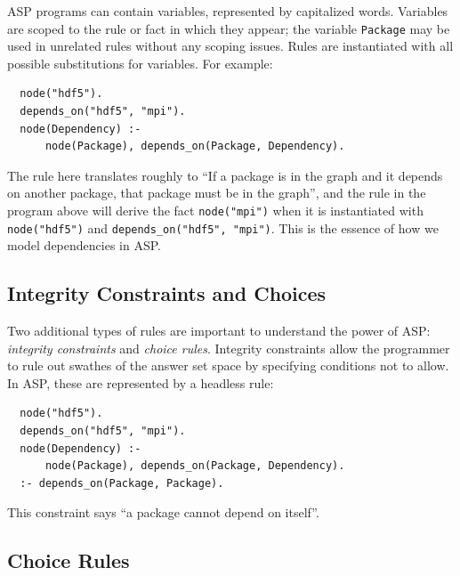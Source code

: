 ASP programs can contain variables, represented by capitalized words. Variables are
scoped to the rule or fact in which they appear; the variable {\tt Package} may be used
in unrelated rules without any scoping issues. Rules are instantiated with all possible
substitutions for variables. For example:
\begin{verbatim}
  node("hdf5").
  depends_on("hdf5", "mpi").
  node(Dependency) :-
      node(Package), depends_on(Package, Dependency).
\end{verbatim}
The rule here translates roughly to ``If a package is in the graph and it depends on
another package, that package must be in the graph'', and the rule in the program above
will derive the fact {\tt node("mpi")} when it is instantiated with {\tt
  node("hdf5")} and {\tt depends\_on("hdf5", "mpi")}. This is the essence of how
  we model dependencies in ASP.

\subsection{Integrity Constraints and Choices}

Two additional types of rules are important to understand the power of ASP:
\textit{integrity constraints} and \textit{choice rules}.
Integrity constraints allow the programmer to rule out swathes of the answer set space
by specifying conditions not to allow. In ASP, these are represented by a headless rule:
\begin{verbatim}
  node("hdf5").
  depends_on("hdf5", "mpi").
  node(Dependency) :-
      node(Package), depends_on(Package, Dependency).
  :- depends_on(Package, Package).
\end{verbatim}
This constraint says ``a package cannot depend on itself''.

\subsection{Choice Rules}

